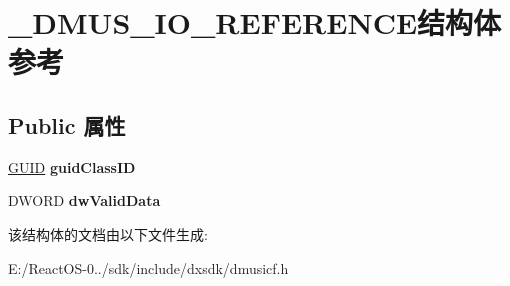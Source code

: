 \hypertarget{struct___d_m_u_s___i_o___r_e_f_e_r_e_n_c_e}{}\section{\+\_\+\+D\+M\+U\+S\+\_\+\+I\+O\+\_\+\+R\+E\+F\+E\+R\+E\+N\+C\+E结构体 参考}
\label{struct___d_m_u_s___i_o___r_e_f_e_r_e_n_c_e}
\subsection*{Public 属性}
\begin{DoxyCompactItemize}
\item 
\mbox{\label{struct___d_m_u_s___i_o___r_e_f_e_r_e_n_c_e_a31655421bc9be034bd60cf59e8de66d5}} 
\hyperlink{interface_g_u_i_d}{G\+U\+ID} {\bfseries guid\+Class\+ID}
\item 
\mbox{\label{struct___d_m_u_s___i_o___r_e_f_e_r_e_n_c_e_ad6d90a96b82b9f698d77411660018121}} 
D\+W\+O\+RD {\bfseries dw\+Valid\+Data}
\end{DoxyCompactItemize}


该结构体的文档由以下文件生成\+:\begin{DoxyCompactItemize}
\item 
E\+:/\+React\+O\+S-\/0../sdk/include/dxsdk/dmusicf.\+h\end{DoxyCompactItemize}
